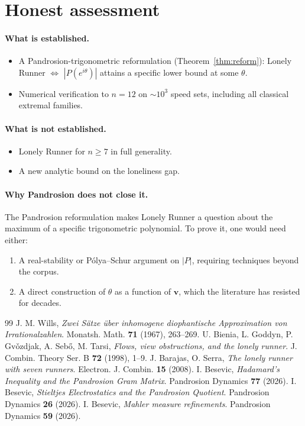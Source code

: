 \documentclass[11pt,a4paper]{article}
\begin{document}
\section{Honest assessment}\label{sec:assessment}

\paragraph{What is established.}
\begin{itemize}
\item A Pandrosion-trigonometric reformulation
(Theorem~\ref{thm:reform}): Lonely Runner $\Leftrightarrow$ $|P(e^{i\theta})|$
attains a specific lower bound at some $\theta$.
\item Numerical verification to $n = 12$ on $\sim 10^3$ speed sets, including
all classical extremal families.
\end{itemize}

\paragraph{What is not established.}
\begin{itemize}
\item Lonely Runner for $n \ge 7$ in full generality.
\item A new analytic bound on the loneliness gap.
\end{itemize}

\paragraph{Why Pandrosion does not close it.}
The Pandrosion reformulation makes Lonely Runner a question about the
maximum of a specific trigonometric polynomial. To prove it, one would need
either:
\begin{enumerate}
\item A real-stability or Pólya--Schur argument on $|P|$, requiring techniques
beyond the corpus.
\item A direct construction of $\theta$ as a function of $\mathbf{v}$, which
the literature has resisted for decades.
\end{enumerate}

\begin{thebibliography}{99}
 J. M. Wills, \textit{Zwei S\"atze \"uber inhomogene
diophantische Approximation von Irrationalzahlen}. Monatsh. Math.
\textbf{71} (1967), 263--269.
 U. Bienia, L. Goddyn, P. Gv\v{o}zdjak, A. Seb\H{o},
M. Tarsi, \textit{Flows, view obstructions, and the lonely runner}.
J. Combin. Theory Ser. B \textbf{72} (1998), 1--9.
 J. Barajas, O. Serra, \textit{The lonely runner with seven runners}.
Electron. J. Combin. \textbf{15} (2008).
 I. Besevic, \textit{Hadamard's Inequality and the Pandrosion
Gram Matrix}. Pandrosion Dynamics \textbf{77} (2026).
 I. Besevic, \textit{Stieltjes Electrostatics and the
Pandrosion Quotient}. Pandrosion Dynamics \textbf{26} (2026).
 I. Besevic, \textit{Mahler measure refinements}.
Pandrosion Dynamics \textbf{59} (2026).
\end{thebibliography}
\end{document}
